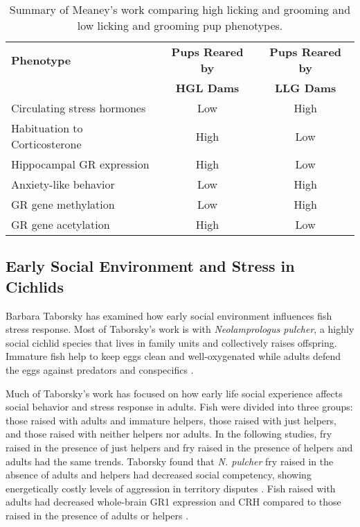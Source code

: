 \documentclass[12pt,twoside]{reedthesis}
\begin{document}
\begin{table}[htbp]
\caption[Summary of Meaney's work comparing high licking and grooming and low licking and grooming
pup phenotypes]{Summary of Meaney's work comparing high licking and grooming and low licking and grooming
pup phenotypes.}
\begin{center}
\footnotesize
\begin{tabular}{ | l | c | c | }
  \hline
  \textbf{Phenotype} & \textbf{Pups Reared by} & \textbf{Pups Reared by} \\
  & \textbf{HGL Dams} & \textbf{LLG Dams} \\
\hline
 Circulating stress hormones & Low & High\\
\hline
 Habituation to Corticosterone  & High & Low\\
\hline
  Hippocampal GR expression & High & Low\\
\hline
  Anxiety-like behavior & Low & High\\
\hline
  GR gene methylation & Low & High \\
\hline
  GR gene acetylation & High & Low \\
  \hline
\end{tabular}
\end{center}
\end{table}

\subsection{Early Social Environment and Stress in Cichlids}

Barbara Taborsky has examined how early social environment influences fish
stress response.
Most of Taborsky's work is with \textit{Neolamprologus pulcher}, a highly social cichlid species
that lives in family units and collectively raises offspring. Immature fish help
to keep eggs clean and well-oxygenated while adults defend the eggs against
predators and conspecifics \citep{arnold_social_2010}.

Much of Taborsky's work has focused on
how early life social experience affects social behavior and stress response in
adults. Fish were divided into three groups: those raised with adults and
immature helpers, those raised with just helpers, and those raised with neither
helpers nor adults. In the following studies, fry raised in the presence of just
helpers and fry raised in the presence of helpers and adults had the same
trends. Taborsky found that \textit{N. pulcher} fry raised in the
absence of adults and helpers had decreased social competency, showing
energetically costly levels of aggression in territory disputes \citep{arnold_social_2010}. Fish raised with adults had decreased whole-brain GR1
expression and CRH compared to those raised in the presence of adults or helpers
\citep{taborsky_stable_2012}.
\end{document}

